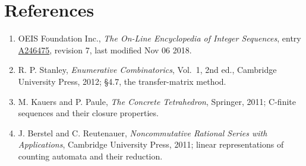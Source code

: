 \documentclass[11pt]{article}
\theoremstyle{definition}
\begin{document}
\section{References}

\begin{enumerate}

\item OEIS Foundation Inc., \emph{The On-Line Encyclopedia of Integer Sequences}, entry \href{https://oeis.org/A246475}{A246475}, revision 7, last modified Nov 06 2018.

\item R. P. Stanley, \emph{Enumerative Combinatorics}, Vol.~1, 2nd ed., Cambridge University Press, 2012; \S4.7, the transfer-matrix method.

\item M. Kauers and P. Paule, \emph{The Concrete Tetrahedron}, Springer, 2011; C-finite sequences and their closure properties.

\item J. Berstel and C. Reutenauer, \emph{Noncommutative Rational Series with Applications}, Cambridge University Press, 2011; linear representations of counting automata and their reduction.

\end{enumerate}
\end{document}
